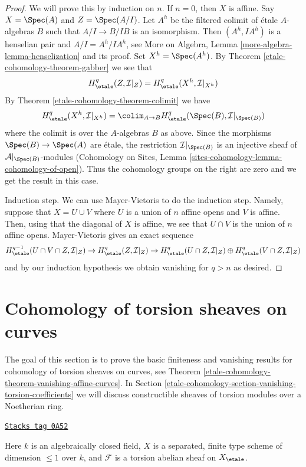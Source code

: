 \begin{proof}
We will prove this by induction on $n$. If $n = 0$, then $X$ is affine.
Say $X = \Spec(A)$ and $Z = \Spec(A/I)$. Let $A^h$ be the filtered colimit
of \'etale $A$-algebras $B$ such that $A/I \to B/IB$ is an isomorphism.
Then $(A^h, IA^h)$ is a henselian pair and $A/I = A^h/IA^h$, see
More on Algebra, Lemma \ref{more-algebra-lemma-henselization}
and its proof. Set $X^h = \Spec(A^h)$.
By Theorem \ref{etale-cohomology-theorem-gabber}
we see that
$$
H^q_\etale(Z, \mathcal{I}|_Z) = H^q_\etale(X^h, \mathcal{I}|_{X^h})
$$
By Theorem \ref{etale-cohomology-theorem-colimit} we have
$$
H^q_\etale(X^h, \mathcal{I}|_{X^h}) =
\colim_{A \to B} H^q_\etale(\Spec(B), \mathcal{I}|_{\Spec(B)})
$$
where the colimit is over the $A$-algebras $B$ as above.
Since the morphisms $\Spec(B) \to \Spec(A)$ are \'etale,
the restriction $\mathcal{I}|_{\Spec(B)}$ is an injective
sheaf of $\mathcal{A}|_{\Spec(B)}$-modules
(Cohomology on Sites, Lemma \ref{sites-cohomology-lemma-cohomology-of-open}).
Thus the cohomology groups on the right are zero and we get the
result in this case.

\medskip\noindent
Induction step. We can use Mayer-Vietoris to do the induction step.
Namely, suppose that $X = U \cup V$ where $U$ is a union of $n$ affine
opens and $V$ is affine. Then, using that the diagonal of $X$ is affine,
we see that $U \cap V$ is the union of $n$ affine opens. Mayer-Vietoris
gives an exact sequence
$$
H^{q - 1}_\etale(U \cap V \cap Z, \mathcal{I}|_Z) \to
H^q_\etale(Z, \mathcal{I}|_Z) \to
H^q_\etale(U \cap Z, \mathcal{I}|_Z) \oplus
H^q_\etale(V \cap Z, \mathcal{I}|_Z)
$$
and by our induction hypothesis we obtain vanishing for $q > n$ as desired.
\end{proof}

\section{Cohomology of torsion sheaves on curves}
\label{etale-cohomology-section-vanishing-torsion}
The goal of this section is to prove the basic finiteness and vanishing
results for cohomology of torsion sheaves on curves, see
Theorem \ref{etale-cohomology-theorem-vanishing-affine-curves}.
In Section \ref{etale-cohomology-section-vanishing-torsion-coefficients}
we will discuss constructible sheaves of torsion modules
over a Noetherian ring.

\begin{definition}
\label{etale-cohomology-situation-what-to-prove}
\href{https://stacks.math.columbia.edu/tag/0A52}{\texttt{Stacks tag 0A52}}

Here $k$ is an algebraically closed field, $X$ is a separated, finite type
scheme of dimension $\leq 1$ over $k$, and $\mathcal{F}$ is a torsion
abelian sheaf on $X_\etale$.
\end{definition}

